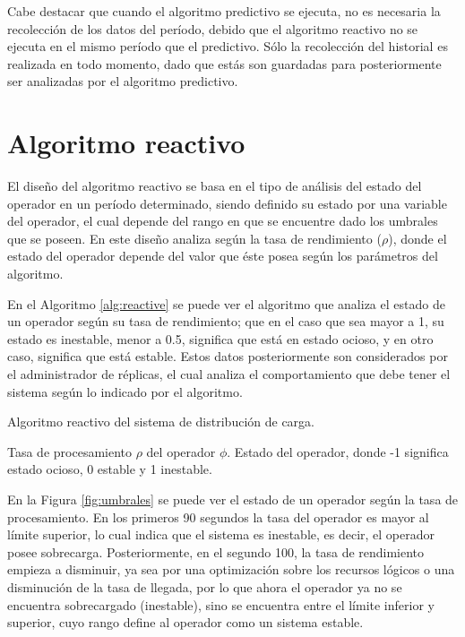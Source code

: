 Cabe destacar que cuando el algoritmo predictivo se ejecuta, no es necesaria la recolección de los datos del período, debido que el algoritmo reactivo no se ejecuta en el mismo período que el predictivo. Sólo la recolección del historial es realizada en todo momento, dado que estás son guardadas para posteriormente ser analizadas por el algoritmo predictivo.

\section{Algoritmo reactivo}
El diseño del algoritmo reactivo se basa en el tipo de análisis del estado del operador en un período determinado, siendo definido su estado por una variable del operador, el cual depende del rango en que se encuentre dado los umbrales que se poseen. En este diseño analiza según la tasa de rendimiento ($\rho$), donde el estado del operador depende del valor que éste posea según los parámetros del algoritmo.

En el Algoritmo \ref{alg:reactive} se puede ver el algoritmo que analiza el estado de un operador según su tasa de rendimiento; que en el caso que sea mayor a 1, su estado es inestable, menor a 0.5, significa que está en estado ocioso, y en otro caso, significa que está estable. Estos datos posteriormente son considerados por el administrador de réplicas, el cual analiza el comportamiento que debe tener el sistema según lo indicado por el algoritmo.

\begin{algorithm}[!ht]
	\caption{Algoritmo reactivo del sistema de distribución de carga.}
	\label{alg:reactive}
	\begin{algorithmic}[1]
	\REQUIRE Tasa de procesamiento $\rho$ del operador $\phi$.
	\ENSURE Estado del operador, donde -1 significa estado ocioso, 0 estable y 1 inestable.
	\ELSE
	\ENDIF
	\end{algorithmic}
\end{algorithm}

En la Figura \ref{fig:umbrales} se puede ver el estado de un operador según la tasa de procesamiento. En los primeros 90 segundos la tasa del operador es mayor al límite superior, lo cual indica que el sistema es inestable, es decir, el operador posee sobrecarga. Posteriormente, en el segundo 100, la tasa de rendimiento empieza a disminuir, ya sea por una optimización sobre los recursos lógicos o una disminución de la tasa de llegada, por lo que ahora el operador ya no se encuentra sobrecargado (inestable), sino se encuentra entre el límite inferior y superior, cuyo rango define al operador como un sistema estable.

